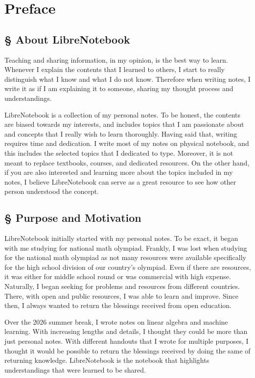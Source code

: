 \documentclass[../main.tex]{subfiles}
\begin{document}
\chapter*{Preface}

\section*{\S\! About LibreNotebook}

Teaching and sharing information, in my opinion, is the best way to
learn. Whenever I explain the contents that I learned to others,
I start to really distinguish what I know and what I do not know.
Therefore when writing notes, I write it as if I am explaining it to
someone, sharing my thought process and understandings.

LibreNotebook is a collection of my personal notes. To be honest,
the contents are biased towards my interests, and includes topics
that I am passionate about and concepts that I really wish to
learn thoroughly. Having said that, writing requires time and
dedication. I write most of my notes on physical notebook, and this
includes the selected topics that I dedicated to type. Moreover,
it is not meant to replace textbooks, courses, and dedicated
resources. On the other hand, if you are also interested and learning
more about the topics included in my notes, I believe LibreNotebook
can serve as a great resource to see how other person understood
the concept.

\section*{\S\! Purpose and Motivation}

LibreNotebook initially started with my personal notes. To be exact,
it began with me studying for national math olympiad. Frankly,
I was lost when studying for the national math olympiad as not
many resources were available specifically for the high school
division of our country's olympiad. Even if there are resources,
it was either for middle school round or was commercial with high
expense. Naturally, I began seeking for problems and resources from
different countries. There, with open and public resources, I was able
to learn and improve. Since then, I always wanted to return the
blessings received from open education.

Over the 2026 summer break, I wrote notes on linear algebra and
machine learning. With increasing lengths and details, I thought they
could be more than just personal notes. With different handouts that I
wrote for multiple purposes, I thought it would be possible to return
the blessings received by doing the same of returning knowledge.
LibreNotebook is the notebook that highlights understandings that were
learned to be shared.
\end{document}
